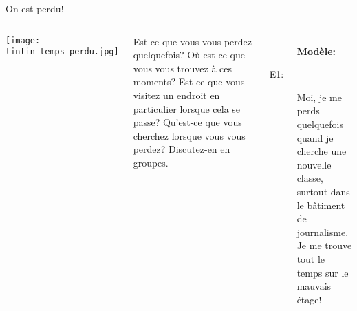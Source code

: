 \begin{frame}{On est perdu!}
  \begin{columns}
      \begin{center}
        \texttt{[image: tintin\_temps\_perdu.jpg]}
      \end{center}
      Est-ce que \alert{vous vous perdez} quelquefois?
      Où est-ce que \alert{vous vous trouvez} à ces moments? 
      Est-ce que \alert{vous visitez} un endroit en particulier lorsque cela se passe?
      Qu'est-ce que \alert{vous cherchez} lorsque vous vous perdez?
      Discutez-en en groupes.
      \begin{description}
        \item[] \textbf{Modèle:}
        \item[E1:] Moi, \alert{je me perds} quelquefois quand \alert{je cherche} une nouvelle classe, surtout dans le bâtiment de journalisme. \alert{Je me trouve} tout le temps sur le mauvais étage!
      \end{description}
  \end{columns}
\end{frame}